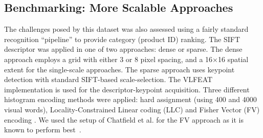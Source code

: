 %
%





\subsection{Benchmarking: More Scalable Approaches}
\label{sec:bof}

The challenges posed by this dataset was also assessed using a fairly standard recognition ``pipeline'' to provide category (product ID) ranking. The SIFT descriptor was applied in one of two approaches: dense or sparse. The dense approach employs a grid with either 3 or 8 pixel spacing, and a 16$\times$16 spatial extent for the single-scale approaches. The sparse approach uses keypoint detection with standard SIFT-based scale-selection. The VLFEAT implementation is used for the descriptor-keypoint acquisition. Three different histogram encoding methods were applied: hard assignment \cite{Csurka2004} (using 400 and 4000 visual words), Locality-Constrained Linear coding (LLC) \cite{Wang2010} and Fisher Vector (FV) encoding \cite{Perronnin2010}. We used the setup of Chatfield et al. for the FV approach as it is known to perform best~\cite{Chatfield2011}.

